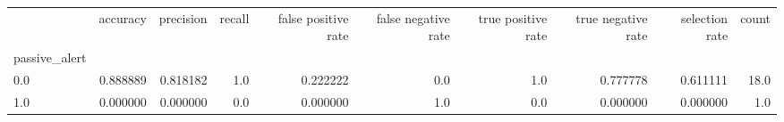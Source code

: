 \begin{tabular}{lrrrrrrrrr}
\toprule
{} &  accuracy &  precision &  recall &  false positive rate &  false negative rate &  true positive rate &  true negative rate &  selection rate &  count \\
passive\_alert &           &            &         &                      &                      &                     &                     &                 &        \\
\midrule
0.0           &  0.888889 &   0.818182 &     1.0 &             0.222222 &                  0.0 &                 1.0 &            0.777778 &        0.611111 &   18.0 \\
1.0           &  0.000000 &   0.000000 &     0.0 &             0.000000 &                  1.0 &                 0.0 &            0.000000 &        0.000000 &    1.0 \\
\bottomrule
\end{tabular}
